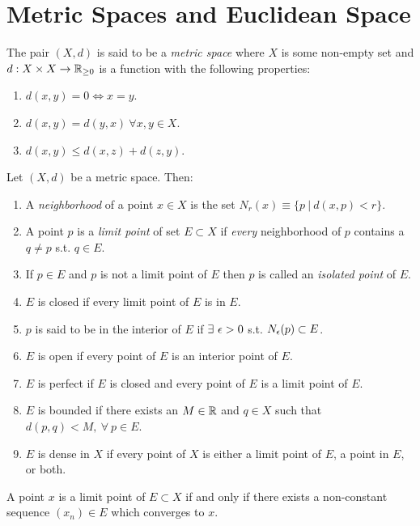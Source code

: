 \section{Metric Spaces and Euclidean Space}
\begin{definition}
  The pair $(X,d)$ is said to be a \textit{metric space} where $X$ is some non-empty set and $d:X\times X\to \mathbb{R}_{\geq 0}$ is a function with the following properties:
\begin{enumerate}
  \item $d(x,y) = 0 \iff x = y$.
  \item $d(x,y) = d(y,x)\ \forall x,y\in X$.
  \item $d(x,y) \leq d(x,z) + d(z,y)$.
\end{enumerate}
\end{definition}
\begin{definition}
  Let $(X,d)$ be a metric space. Then:
  \begin{enumerate}
    \item A \textit{neighborhood} of a point $x\in X$ is the set $N_r(x) \equiv \{p\ |\ d(x,p) <r\}$.
    \item A point $p$ is a \textit{limit point} of set $E\subset X$ if \textit{every} neighborhood of $p$ contains a $q\neq p$ s.t. $q\in E$.
    \item If $p\in E$ and $p$ is not a limit point of $E$ then $p$ is called an \textit{isolated point} of $E$.
    \item $E$ is closed if every limit point of $E$ is in $E$.
    \item $p$ is said to be in the interior of $E$ if $\exists\ \epsilon>0$ s.t. $N_\epsilon(p)\subset E$.
    \item $E$ is open if every point of $E$ is an interior point of $E$.
    \item $E$ is perfect if $E$ is closed and every point of $E$ is a limit point of $E$.
    \item $E$ is bounded if there exists an $M\in \mathbb{R}$ and $q\in X$ such that $d(p,q) < M,\ \forall\ p\in E$.
    \item $E$ is dense in $X$ if every point of $X$ is either a limit point of $E$, a point in $E$, or both.
  \end{enumerate}
\end{definition}
\begin{proposition}
  A point $x$ is a limit point of $E\subset X$ if and only if there exists a non-constant sequence $(x_n)\in E$ which converges to $x$.
\end{proposition}
